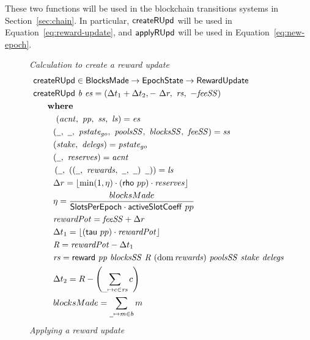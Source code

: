 These two functions will be used in the blockchain transitions systems in Section~\ref{sec:chain}.
In particular,
$\mathsf{createRUpd}$ will be used in Equation~\ref{eq:reward-update},
and $\mathsf{applyRUpd}$ will be used in Equation~\ref{eq:new-epoch}.

\begin{figure}[htb]
  \emph{Calculation to create a reward update}
  \begin{align*}
      & \fun{createRUpd} \in \BlocksMade \to \EpochState \to \RewardUpdate \\
      & \createRUpd{b}{es} = \left(
        \Delta t_1+\Delta t_2,-~\Delta r,~\var{rs},~-\var{feeSS} \right) \\
      & ~~~\where \\
      &~~~~~~~~(\var{acnt},~\var{pp},~\var{ss},~\var{ls}) = \var{es} \\
      & ~~~~~~~(\wcard,~\wcard,~\var{pstate_{go}},~\var{poolsSS},~\var{blocksSS},~\var{feeSS})
        = \var{ss}\\
      & ~~~~~~~(\var{stake},~\var{delegs}) = \var{pstate_{go}} \\
      & ~~~~~~~(\wcard,~\var{reserves}) = \var{acnt} \\
      & ~~~~~~~\left(
                 \wcard,~
                 \left(
                   \left(\wcard,~\var{rewards},~\wcard,~\wcard\right)~
                   \wcard
                 \right)
               \right) = \var{ls} \\
      & ~~~~~~~\Delta r = \floor*{\min(1,\eta) \cdot (\fun{rho}~{pp}) \cdot \var{reserves}}
    \\
      & ~~~~~~~\eta = \frac{blocksMade}{\SlotsPerEpoch \cdot \fun{activeSlotCoeff}~{pp}} \\
      & ~~~~~~~\var{rewardPot} = \var{feeSS} + \Delta r \\
      & ~~~~~~~\Delta t_1 = \floor*{(\fun{tau}~{pp}) \cdot \var{rewardPot}} \\
      & ~~~~~~~\var{R} = \var{rewardPot} - \Delta t_1 \\
      & ~~~~~~~\var{rs}
           = \reward{pp}{blocksSS}{R}{(\dom{rewards})}{poolsSS}{stake}{delegs} \\
      & ~~~~~~~\Delta t_{2} = R - \left(\sum\limits_{\_\mapsto c\in\var{rs}}c\right) \\
      & ~~~~~~~blocksMade = \sum_{\wcard \mapsto m \in b}m
  \end{align*}
  \emph{Applying a reward update}
  \begin{align*}

\end{align*}
\end{figure}
